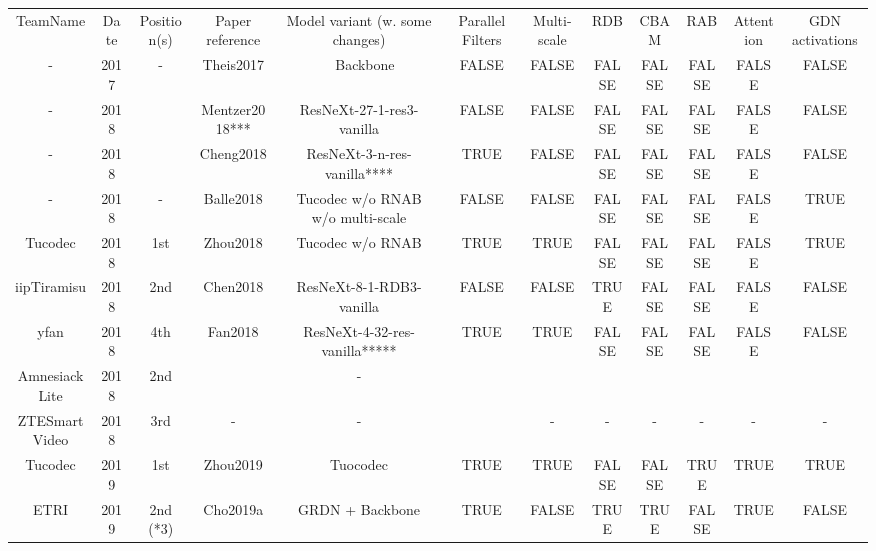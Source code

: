 \begin{tabular}{cccccccccccc}
TeamName      & Date & Position(s) & Paper reference & Model variant (w. some changes)  & Parallel Filters & Multi-scale & RDB   & CBAM  & RAB   & Attention & GDN activations   \\
-             & 2017 & -           & Theis2017       & ~ Backbone                       & FALSE            & FALSE       & FALSE & FALSE & FALSE & FALSE     & FALSE             \\
-             & 2018 &             & Mentzer2018***  & ResNeXt-27-1-res3-vanilla        & FALSE            & FALSE       & FALSE & FALSE & FALSE & FALSE     & FALSE             \\
-             & 2018 &             & Cheng2018       & ResNeXt-3-n-res-vanilla****      & TRUE             & FALSE       & FALSE & FALSE & FALSE & FALSE     & FALSE             \\
-             & 2018 & -           & Balle2018       & Tucodec w/o RNAB w/o multi-scale & FALSE            & FALSE       & FALSE & FALSE & FALSE & FALSE     & TRUE              \\
Tucodec       & 2018 & 1st         & Zhou2018        & Tucodec w/o RNAB                 & TRUE             & TRUE        & FALSE & FALSE & FALSE & FALSE     & TRUE              \\
iipTiramisu   & 2018 & 2nd         & Chen2018        & ResNeXt-8-1-RDB3-vanilla         & FALSE            & FALSE       & TRUE  & FALSE & FALSE & FALSE     & FALSE             \\
yfan          & 2018 & 4th         & Fan2018         & ResNeXt-4-32-res-vanilla*****    & TRUE             & TRUE        & FALSE & FALSE & FALSE & FALSE     & FALSE             \\
AmnesiackLite & 2018 & 2nd         &                 & -                                &                  &             &       &       &       &           &                   \\
ZTESmartVideo & 2018 & 3rd         & -               & -                                &                  & -           & -     & -     & -     & -         & -                 \\
Tucodec       & 2019 & 1st         & Zhou2019        & Tuocodec                         & TRUE             & TRUE        & FALSE & FALSE & TRUE  & TRUE      & TRUE              \\
ETRI          & 2019 & 2nd (*3)    & Cho2019a        & GRDN + Backbone                  & TRUE             & FALSE       & TRUE  & TRUE  & FALSE & TRUE      & FALSE             \\

\end{tabular}
